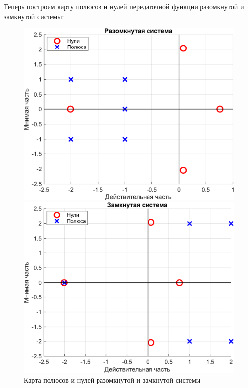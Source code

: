 Теперь построим карту полюсов и нулей передаточной функции разомкнутой и замкнутой системы:
\begin{figure}[H]
    \centering
    \begin{minipage}{0.45\textwidth}
        \centering
        \includegraphics[width=1\textwidth, trim={0cm 0cm 0cm 0cm}]{../images/1_2_map_ol.png}
    \end{minipage}
    \hfill
    \begin{minipage}{0.45\textwidth}
        \centering
        \includegraphics[width=1\textwidth, trim={0cm 0cm 0cm 0cm}]{../images/1_2_map_cl.png}
    \end{minipage}
    \caption{Карта полюсов и нулей разомкнутой и замкнутой системы}
\end{figure}

